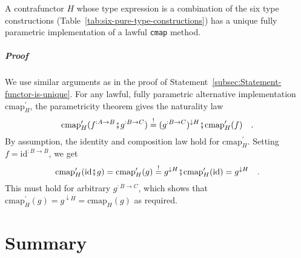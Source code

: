 A contrafunctor $H$ whose type expression is a combination of the
six type constructions (Table~\ref{tab:six-pure-type-constructions})
has a unique fully parametric implementation of a lawful \lstinline!cmap!
method. 

\subparagraph{Proof}

We use similar arguments as in the proof of Statement~\ref{subsec:Statement-functor-is-unique}.
For any lawful, fully parametric alternative implementation $\text{cmap}_{H}^{\prime}$,
the parametricity theorem gives the naturality law
\[
\text{cmap}_{H}^{\prime}(f^{:A\rightarrow B}\bef g^{:B\rightarrow C})\overset{!}{=}(g^{:B\rightarrow C})^{\downarrow H}\bef\text{cmap}_{H}^{\prime}(f)\quad.
\]
By assumption, the identity and composition law hold for $\text{cmap}_{H}^{\prime}$.
Setting $f=\text{id}^{:B\rightarrow B}$, we get
\[
\text{cmap}_{H}^{\prime}(\text{id}\bef g)=\text{cmap}_{H}^{\prime}(g)\overset{!}{=}g^{\downarrow H}\bef\text{cmap}_{H}^{\prime}(\text{id})=g^{\downarrow H}\quad.
\]
This must hold for arbitrary $g^{:B\rightarrow C}$, which shows that
$\text{cmap}_{H}^{\prime}(g)=g^{\downarrow H}=\text{cmap}_{H}(g)$
as required.

\section{Summary}

